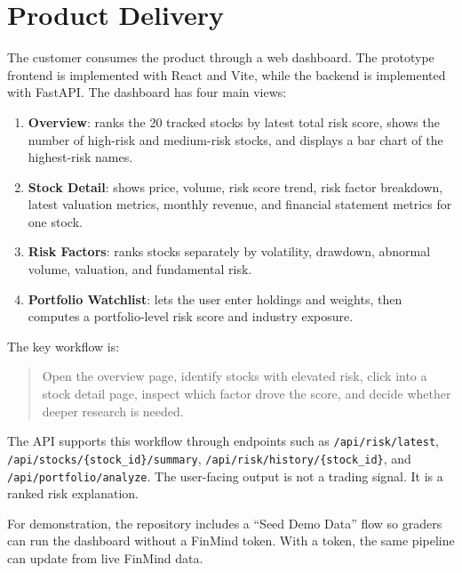 \section{Product Delivery}
\label{sec:product-delivery}

The customer consumes the product through a web dashboard. The prototype frontend is implemented with React and Vite, while the backend is implemented with FastAPI. The dashboard has four main views:

\begin{enumerate}
    \item \textbf{Overview}: ranks the 20 tracked stocks by latest total risk score, shows the number of high-risk and medium-risk stocks, and displays a bar chart of the highest-risk names.
    \item \textbf{Stock Detail}: shows price, volume, risk score trend, risk factor breakdown, latest valuation metrics, monthly revenue, and financial statement metrics for one stock.
    \item \textbf{Risk Factors}: ranks stocks separately by volatility, drawdown, abnormal volume, valuation, and fundamental risk.
    \item \textbf{Portfolio Watchlist}: lets the user enter holdings and weights, then computes a portfolio-level risk score and industry exposure.
\end{enumerate}

The key workflow is:

\begin{quote}
    Open the overview page, identify stocks with elevated risk, click into a stock detail page, inspect which factor drove the score, and decide whether deeper research is needed.
\end{quote}

The API supports this workflow through endpoints such as \texttt{/api/risk/latest}, \texttt{/api/stocks/\{stock\_id\}/summary}, \texttt{/api/risk/history/\{stock\_id\}}, and \texttt{/api/portfolio/analyze}. The user-facing output is not a trading signal. It is a ranked risk explanation.

For demonstration, the repository includes a ``Seed Demo Data'' flow so graders can run the dashboard without a FinMind token. With a token, the same pipeline can update from live FinMind data.
